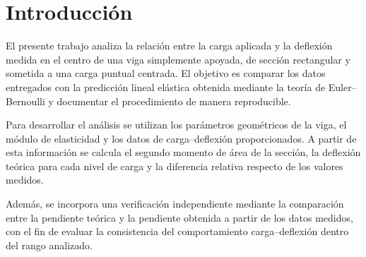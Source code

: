 \begin{abstract}

Se analiza la relación carga--deflexión de una viga simplemente apoyada de sección rectangular sometida a una carga puntual centrada, utilizando datos sintéticos proporcionados para fines docentes. El objetivo es construir un flujo de análisis reproducible que permita comparar las deflexiones medidas con la predicción lineal elástica de Euler--Bernoulli. Para ello, se calcularon el segundo momento de área de la sección y la deflexión teórica para cada nivel de carga, documentando las conversiones de unidades utilizadas. Los resultados muestran una buena concordancia entre los datos medidos y la respuesta teórica: la pendiente teórica de la relación carga--deflexión fue de 0,05000 mm/kN y la pendiente obtenida a partir de los datos medidos fue de 0,05117 mm/kN, con una diferencia relativa de aproximadamente 2,33\%. Esto indica que, dentro del rango analizado, la respuesta presenta un comportamiento prácticamente lineal y consistente con el modelo utilizado. Como limitación, el análisis corresponde a un caso idealizado y a datos sintéticos, por lo que sus resultados deben interpretarse dentro de los supuestos adoptados.

\end{abstract}



\section{Introducción}

El presente trabajo analiza la relación entre la carga aplicada y la deflexión medida en el centro de una viga simplemente apoyada, de sección rectangular y sometida a una carga puntual centrada. El objetivo es comparar los datos entregados con la predicción lineal elástica obtenida mediante la teoría de Euler--Bernoulli y documentar el procedimiento de manera reproducible.

Para desarrollar el análisis se utilizan los parámetros geométricos de la viga, el módulo de elasticidad y los datos de carga--deflexión proporcionados. A partir de esta información se calcula el segundo momento de área de la sección, la deflexión teórica para cada nivel de carga y la diferencia relativa respecto de los valores medidos.

Además, se incorpora una verificación independiente mediante la comparación entre la pendiente teórica y la pendiente obtenida a partir de los datos medidos, con el fin de evaluar la consistencia del comportamiento carga--deflexión dentro del rango analizado.


